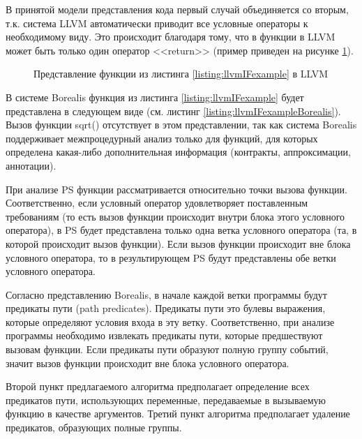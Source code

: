 В принятой модели представления кода первый случай объединяется со вторым, т.к. система LLVM автоматически приводит все условные операторы к необходимому виду. Это происходит благодаря тому, что в функции в LLVM может быть только один оператор <<return>> (пример приведен на рисунке \ref{image:llvmIFcfg}).

 	
\begin{figure}[h!]
\caption{Представление функции из листинга \ref{listing:llvmIFexample} в LLVM}
\label{image:llvmIFcfg}
\end{figure}

В системе Borealis функция из листинга \ref{listing:llvmIFexample} будет представлена в следующем виде (см. листинг \ref{listing:llvmIFexampleBorealis}). Вызов функции sqrt() отсутствует в этом представлении, так как система Borealis поддерживает межпроцедурный анализ только для функций, для которых определена какая-либо дополнительная информация (контракты, аппроксимации, аннотации).


При анализе PS функции рассматривается относительно точки вызова функции. Соответственно, если условный оператор удовлетворяет поставленным требованиям (то есть вызов функции происходит внутри блока этого условного оператора), в PS будет представлена только одна ветка условного оператора (та, в которой происходит вызов функции). Если вызов функции происходит вне блока условного оператора, то в результирующем PS будут представлены обе ветки условного оператора.

Согласно представлению Borealis, в начале каждой ветки программы будут предикаты пути (path predicates). Предикаты пути это булевы выражения, которые определяют условия входа в эту ветку. Соответственно, при анализе программы необходимо извлекать предикаты пути, которые предшествуют вызовам функции. Если предикаты пути образуют полную группу событий, значит вызов функции происходит вне блока условного оператора.

Второй пункт предлагаемого алгоритма предполагает определение всех предикатов пути, использующих переменные, передаваемые в вызываемую функцию в качестве аргументов. Третий пункт алгоритма предполагает удаление предикатов, образующих полные группы.

